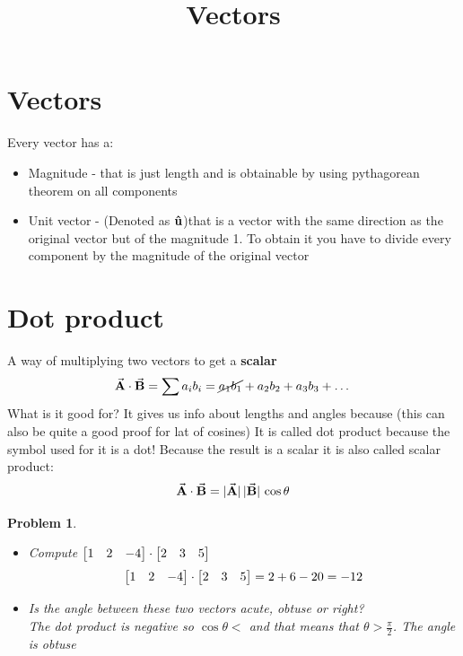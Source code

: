 \documentclass{article}
\begin{document}
    \title{Vectors}
    \maketitle
    \newtheorem{theorem}{Theorem}
    \newtheorem{definition}{Definition}
    \newtheorem{example}{Example}
    \newtheorem{problem}{Problem}

    \section{Vectors}

    Every vector has a:
    \begin{itemize}
        \item Magnitude - that is just length and is obtainable by using pythagorean theorem on all components
        \item Unit vector - (Denoted as $\vu{u}$)that is a vector with the same direction as the original vector but of the magnitude 1. To obtain it you have to divide every component by the magnitude of the original vector
    \end{itemize}

    \section{Dot product}

    A way of multiplying two vectors to get a \textbf{scalar}
    \[\va{A}\cdot\va{B}=\sum{a_ib_i}=\cancel{a_1b_1}+a_2b_2+a_3b_3+\dots\]
    What is it good for? It gives us info about lengths and angles because (this can also be quite a good proof for lat of cosines) It is called dot product because the symbol used for it is a dot! Because the result is a scalar it is also called scalar product:
    \[\va{A}\cdot\va{B}=\abs*{\va{A}}\abs*{\va{B}}\cos{\theta}\]



    \begin{problem}
        \begin{itemize}
            \item[a)]Compute $\bmqty{1 & 2 & -4}\cdot\bmqty{2 & 3 & 5}$
            \[
                \bmqty{1 & 2 & -4}\cdot\bmqty{2 & 3 & 5}=2+6-20=-12
            \]
            \item[b)] Is the angle between these two vectors acute, obtuse or right?\\
            The dot product is negative so $\cos{\theta}<$ and that means that $\theta > \frac{\pi}{2}$. The angle is obtuse
        \end{itemize}
    \end{problem}
\end{document}
